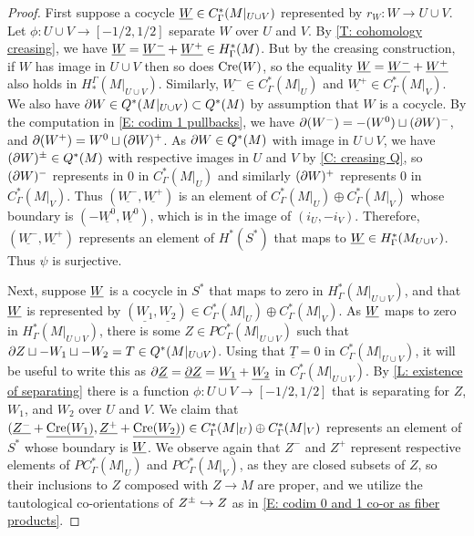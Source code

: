 \begin{proof}
	First suppose a cocycle $\underline{W} \in C_{\Gamma}^*(M|_{U \cup V})$ represented by $r_W \colon W \to U \cup V$.
	Let $\phi \colon U \cup V \to [-1/2,1/2]$ separate $W$ over $U$ and $V$.
	By \cref{T: cohomology creasing}, we have $\underline{W} = \underline{W^-}+\underline{W^+} \in H^*_\Gamma(M)$.
	But by the creasing construction, if $W$ has image in $U \cup V$ then so does $\mathrm{Cre}(W)$, so the equality $\underline{W} = \underline{W^-}+\underline{W^+}$ also holds in $H_*^\Gamma(M|_{U \cup V})$.
	Similarly, $\underline{W^-} \in C_{\Gamma}^*(M|_{U})$ and $\underline{W^+} \in C_{\Gamma}^*(M|_{V})$.
	We also have $\partial W \in Q^*(M|_{U \cup V}) \subset Q^*(M)$ by assumption that $W$ is a cocycle.
	By the computation in \cref{E: codim 1 pullbacks}, we have $\partial(W^-) = -(W^0) \sqcup (\partial W)^-$, and $\partial (W^+) = W^0 \sqcup (\partial W)^+$.
	As $\partial W \in Q^*(M)$ with image in $U \cup V$, we have $(\partial W)^\pm \in Q^*(M)$ with respective images in $U$ and $V$ by \cref{C: creasing Q}, so $(\partial W)^-$ represents in $0$ in $C^*_\Gamma(M|_U)$ and similarly $(\partial W)^+$ represents $0$ in $C^*_\Gamma(M|_V)$.
	Thus $(\underline{W^-}, \underline{W^+})$ is an element of $C_{\Gamma}^*(M|_U) \oplus C_{\Gamma}^{*}(M|_V)$ whose boundary is $(-\underline{W^0},\underline{W^0})$, which is in the image of $(i_U,-i_V)$.
	Therefore, $(\underline{W^-}, \underline{W^+})$ represents an element of
	$H^*(S^*)$ that maps to $\underline{W} \in H^*_\Gamma(M_{U \cup V})$.
	Thus $\psi$ is surjective.

	Next, suppose $\underline{W}$ is a cocycle in $S^*$ that maps to zero in $H_{\Gamma}^*(M|_{U \cup V})$, and that $\underline{W}$ is represented by $(\underline{W_1},\underline{W_2}) \in C^*_\Gamma(M|_U) \oplus C^*_\Gamma(M|_V)$.
	As $\underline{W}$ maps to zero in $H_{\Gamma}^*(M|_{U \cup V})$, there is some $Z \in PC^*_\Gamma(M|_{U \cup V})$ such that $\partial Z \sqcup - W_1 \sqcup -W_2 = T \in Q^*(M|_{U \cup V})$.
	Using that $\underline T = 0$ in $C^*_\Gamma(M|_{U \cup V})$, it will be useful to write this as $\partial \underline{Z} = \underline{\partial Z} = \underline{W_1} + \underline {W_2}$ in $C^*_\Gamma(M|_{U \cup V})$.
	By \cref{L: existence of separating} there is a function $\phi \colon U \cup V \to [-1/2,1/2]$ that is separating for $Z$, $W_1$, and $W_2$ over $U$ and $V$.
 	We claim that $(\underline{Z^-}+\underline{\mathrm{Cre}(W_1)},\underline{Z^+}+\underline{\mathrm{Cre}(W_2)}) \in C^*_\Gamma(M|_U) \oplus C^*_\Gamma(M|_V)$ represents an element of $S^*$ whose boundary is $\underline{W}$.
	We observe again that $Z^-$ and $Z^+$ represent respective elements of $PC^*_\Gamma(M|_U)$ and $PC^*_\Gamma(M|_V)$, as they are closed subsets of $Z$, so their inclusions to $Z$ composed with $Z \to M$ are proper, and we utilize the tautological co-orientations of $Z^\pm \hookrightarrow Z$ as in \cref{E: codim 0 and 1 co-or as fiber products}.


\end{proof}
